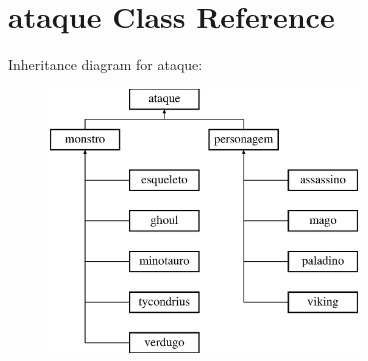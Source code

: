 \hypertarget{classataque}{}\section{ataque Class Reference}
\label{classataque}
Inheritance diagram for ataque\+:\begin{figure}[H]
\begin{center}
\leavevmode
\includegraphics[height=7.000000cm]{classataque}
\end{center}
\end{figure}
